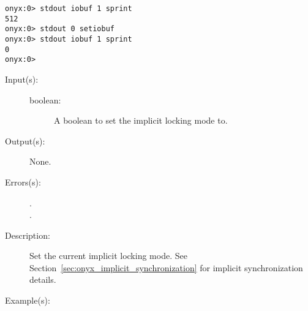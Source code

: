 \begin{description}
\begin{description}
\begin{verbatim}
onyx:0> stdout iobuf 1 sprint
512
onyx:0> stdout 0 setiobuf
onyx:0> stdout iobuf 1 sprint
0
onyx:0>
		\end{verbatim}
	\end{description}
\label{systemdict:setlocking}
\item[{\onyxop{boolean}{setlocking}{--}}: ]
	\begin{description}\item[]
	\item[Input(s): ]
		\begin{description}\item[]
		\item[boolean: ]
			A boolean to set the implicit locking mode to.
		\end{description}
	\item[Output(s): ] None.
	\item[Errors(s): ]
		\begin{description}\item[]
		\item[.]
		\item[.]
		\end{description}
	\item[Description: ]
		Set the current implicit locking mode.  See
		Section~\ref{sec:onyx_implicit_synchronization} for implicit
		synchronization details.
	\item[Example(s): ]\begin{verbatim}


\end{verbatim}
\end{description}
\end{description}
